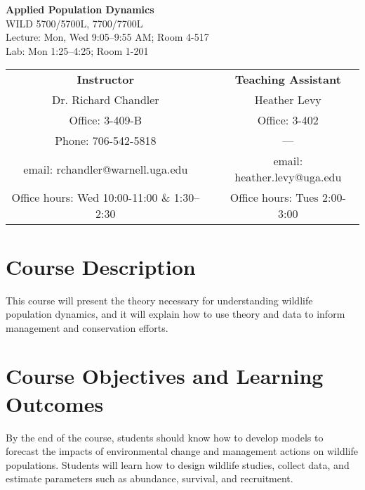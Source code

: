 \documentclass[12pt]{article}
\begin{document}

{\centering

{\Large
  \bf \sc
  Applied Population Dynamics \\}
  WILD 5700/5700L, 7700/7700L  \\
  Lecture: Mon, Wed 9:05--9:55 AM; Room 4-517 \\
  Lab: Mon 1:25--4:25; Room 1-201 \\


\normalsize

\vspace{0.5cm}

\begin{tabular}[h!]{ccc}
\textbf{Instructor}                 & \hspace{1.5cm} & \textbf{Teaching Assistant} \\
Dr. Richard Chandler                & & Heather Levy \\
Office: 3-409-B                     & & Office: 3-402  \\
Phone: 706-542-5818                 & & --- \\
email: rchandler@warnell.uga.edu    & & email: heather.levy@uga.edu \\
Office hours: Wed 10:00-11:00 \& 1:30--2:30  & & Office hours: Tues 2:00-3:00 \\
\end{tabular}


}



\normalsize


\vspace{-2mm}
\section*{\normalsize Course Description}
\vspace{-4mm}
This course will present the theory necessary for understanding
wildlife population dynamics, and it will explain how to use theory
and data to inform management and conservation efforts.

\vspace{-2mm}
\section*{\normalsize Course Objectives and Learning Outcomes}
\vspace{-4mm}
By the end of the course, students should know how to develop models
to forecast the impacts of environmental change and management actions
on wildlife populations. Students will learn how to design wildlife studies,
collect data, and estimate parameters such as abundance,
survival, and recruitment.
\end{document}
